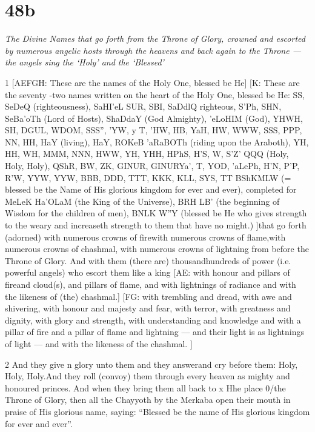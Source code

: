 \chapter{48b}

\par \textit{The Divine Names that go forth from the Throne of Glory, crowned and escorted by numerous angelic hosts through the heavens and back again to the Throne — the angels sing the ‘Holy’ and the ‘Blessed’}

\par 1 [AEFGH: These are the names of the Holy One, blessed be He] [K: These are the seventy -two names written on the heart of the Holy One, blessed be He: SS, SeDeQ (righteousness), SaHI'eL SUR, SBI, SaDdlQ {righteous}, S'Ph, SHN, SeBa'oTh (Lord of Hosts), ShaDdaY (God Almighty), 'eLoHIM (God), YHWH, SH, DGUL, WDOM, SSS'', 'YW, y T, 'HW, HB, YaH, HW, WWW, SSS, PPP, NN, HH, HaY (living), HaY, ROKeB 'aRaBOTh (riding upon the Araboth), YH, HH, WH, MMM, NNN, HWW, YH, YHH, HPhS, H'S, W, S'Z' QQQ (Holy, Holy, Holy), QShR, BW, ZK, GINUR, GINURYa', T, YOD, 'aLePh, H'N, P'P, R'W, YYW, YYW, BBB, DDD, TTT, KKK, KLL, SYS, TT BShKMLW (= blessed be the Name of His glorious kingdom for ever and ever), completed for MeLeK Ha'OLaM (the King of the Universe), BRH LB' (the beginning of Wisdom for the children of men), BNLK W''Y (blessed be He who gives strength to the weary and increaseth strength to them that have no might.) ]that go forth (adorned) with numerous crowns of firewith numerous crowns of flame,with numerous crowns of chashmal, with numerous crowns of lightning from before the Throne of Glory. And with them (there are) thousandhundreds of power (i.e. powerful angels) who escort them like a king [AE: with honour and pillars of fireand cloud(s), and pillars of flame, and with lightnings of radiance and with the likeness of (the) chashmal.] [FG: with trembling and dread, with awe and shivering, with honour and majesty and fear, with terror, with greatness and dignity, with glory and strength, with understanding and knowledge and with a pillar of fire and a  pillar of flame and lightning — and their light is as lightnings of light — and with the likeness of the chashmal. ]

\par 2 And they give n glory unto them and they answerand cry before them: Holy, Holy, Holy.And they roll (convoy) them through every heaven as mighty and honoured princes. And when they bring them all back to x Hhe place 0/the Throne of Glory, then all the Chayyoth by the Merkaba open their mouth in praise of His glorious name, saying: “Blessed be the name of His glorious kingdom for ever and ever”.



